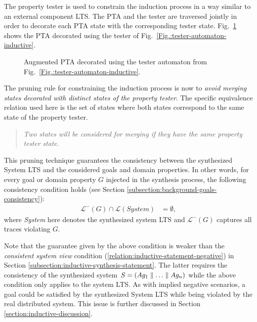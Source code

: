 The property tester is used to constrain the induction process in a way similar to an external component LTS. The PTA and the tester are traversed jointly in order to decorate each PTA state with the corresponding tester state. Fig.~\ref{Fig.:goal-unfolded-pta} shows the PTA decorated using the tester of Fig.~\ref{Fig.:tester-automaton-inductive}.

\begin{figure}
\centering
{}
\caption{Augmented PTA decorated using the tester automaton from Fig.~\ref{Fig.:tester-automaton-inductive}\label{Fig.:goal-unfolded-pta}.}
\end{figure}

The pruning rule for constraining the induction process is now to \emph{avoid merging states decorated with distinct states of the property tester}. The specific equivalence relation used here is the set of states where both states correspond to the same state of the property tester. 
\begin{quote}
\emph{Two states will be considered for merging if they have the same property tester state.}
\end{quote}

This pruning technique guarantees the consistency between the synthesized System LTS and the considered goals and domain properties. In other words, for every goal or domain property $G$ injected in the synthesis process, the following consistency condition holds (see Section \ref{subsection:background-goals-consistency}):
\begin{align*}
\mathcal{L}^-(G) \cap \mathcal{L}(System) &= \emptyset,
\end{align*}
where \emph{System} here denotes the synthesized system LTS and $\mathcal{L}^-(G)$ captures all traces violating $G$.

Note that the guarantee given by the above condition is weaker than the \emph{consistent system view} condition (\ref{relation:inductive-statement-negative}) in Section \ref{subsection:inductive-synthesis-statement}. The latter requires the consistency of the synthesized system $S = (Ag_1 \parallel \ldots \parallel Ag_n)$ while the above condition only applies to the system LTS. As with implied negative scenarios, a goal could be satisfied by the synthesized System LTS while being violated by the real distributed system. This issue is further discussed in Section \ref{section:inductive-discussion}.

